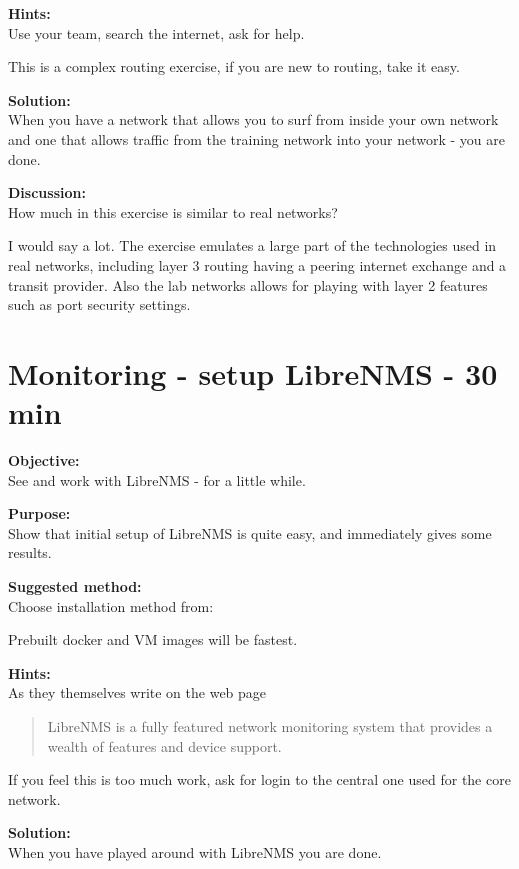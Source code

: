 \documentclass[a4paper,11pt,notitlepage]{report}
\begin{document}
{\bf Hints:}\\
Use your team, search the internet, ask for help.

This is a complex routing exercise, if you are new to routing, take it easy.

{\bf Solution:}\\
When you have a network that allows you to surf from inside your own network and one that allows traffic from the training network into your network - you are done.

{\bf Discussion:}\\
How much in this exercise is similar to real networks?

I would say a lot. The exercise emulates a large part of the technologies used in real networks, including layer 3 routing having a peering internet exchange and a transit provider. Also the lab networks allows for playing with layer 2 features such as port security settings.

\chapter{Monitoring - setup LibreNMS - 30 min}
\label{ex:librenms-setup}

{\bf Objective:}\\
See and work with LibreNMS - for a little while.

{\bf Purpose:}\\
Show that initial setup of LibreNMS is quite easy, and immediately gives some results.

{\bf Suggested method:}\\
Choose installation method from:\\

Prebuilt docker and VM images will be fastest.

{\bf Hints:}\\
As they themselves write on the web page 

\begin{quote}
LibreNMS is a fully featured network monitoring system that provides a wealth of features and device support.
\end{quote}

If you feel this is too much work, ask for login to the central one used for the core network.

{\bf Solution:}\\
When you have played around with LibreNMS you are done.
\end{document}
